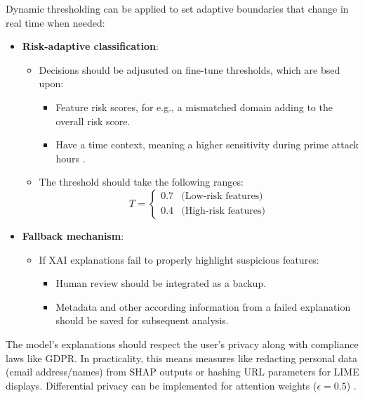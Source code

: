 \noindent Dynamic thresholding can be applied to set adaptive boundaries that change in real time when needed:

\begin{itemize}
  \item \textbf{Risk-adaptive classification}:
  \begin{itemize}
    \item Decisions should be adjusuted on fine-tune thresholds, which are bsed upon:
    \begin{itemize}
      \item Feature risk scores, for e.g., a mismatched domain adding to the overall risk score.
      \item Have a time context, meaning a higher sensitivity during prime attack hours \citep{vishwanath2011people}.
    \end{itemize}
    \item The threshold should take the following ranges:
    \begin{equation}
      T = \begin{cases}
        0.7 & \text{(Low-risk features)} \\
        0.4 & \text{(High-risk features)}
      \end{cases}
    \end{equation}
  \end{itemize}
  \item \textbf{Fallback mechanism}:
  \begin{itemize}
    \item If XAI explanations fail to properly highlight suspicious features:
    \begin{itemize}
      \item Human review should be integrated as a backup.
      \item Metadata and other according information from a failed explanation should be saved for subsequent analysis.
    \end{itemize}
  \end{itemize}
\end{itemize}

\noindent The model's explanations should respect the user's privacy along with compliance laws like GDPR. In practicality, this means measures like redacting personal data (email address/names) from SHAP outputs or hashing URL parameters for LIME displays. Differential privacy can be implemented for attention weights ($\epsilon=0.5$) \citep{hanif2021survey}.
